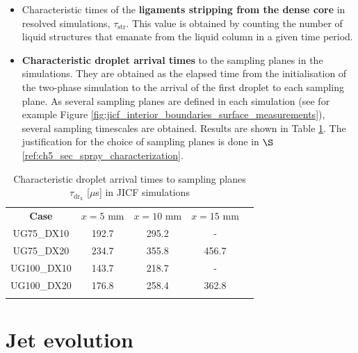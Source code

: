 \begin{itemize}

	\item  Characteristic times of the \textbf{ligaments stripping from the dense core} in resolved simulations, $\tau_\mathrm{str}$. This value is obtained by counting the number of liquid structures that emanate from the liquid column in a given time period.

	
	\item \textbf{Characteristic droplet arrival times} to the sampling planes in the simulations. They are obtained as the elapsed time from the initialisation of the two-phase simulation to the arrival of the first droplet to each sampling plane. As several sampling planes are defined in each simulation (see for example Figure \ref{fig:jicf_interior_boundaries_surface_measurements}), several sampling timescales are obtained. Results are shown in Table \ref{tab:jicf_characteristic_droplet_sampling_times}. The justification for the choice of sampling planes is done in $\S$\ref{ref:ch5_sec_spray_characterization}.


\end{itemize}



\begin{table}[!h]
\centering
\caption{Characteristic droplet arrival times to sampling planes $\tau_\mathrm{dr_x}$ [$\mu$s] in JICF simulations}
\begin{tabular}{ccccc}
\thickhline
\textbf{Case} & $x = 5$ mm & $x = 10$ mm & $x = 15$ mm  \\
\thickhline 
UG75\_DX10  & 192.7 & 295.2 & -  \\
UG75\_DX20  & 234.7 & 355.8 & 456.7 \\
UG100\_DX10 & 143.7 & 218.7 & - \\
UG100\_DX20 & 176.8 & 258.4 & 362.8 \\
\thickhline
\end{tabular}
\label{tab:jicf_characteristic_droplet_sampling_times}
\end{table}



\section{Jet evolution}


